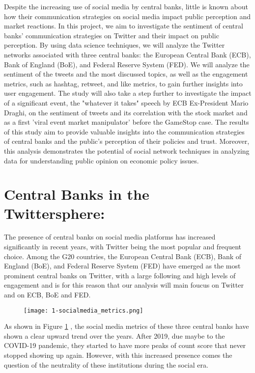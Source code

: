 \documentclass[fleqn,10pt]{SelfArx} %
\begin{document}
Despite the increasing use of social media by central banks, little is known about how their communication strategies on social media impact public perception and market reactions. In this project, we aim to investigate the sentiment of central banks' communication strategies on Twitter and their impact on public perception. By using data science techniques, we will analyze the Twitter networks associated with three central banks: the European Central Bank (ECB), Bank of England (BoE), and Federal Reserve System (FED). We will analyze the sentiment of the tweets and the most discussed topics, as well as the engagement metrics, such as hashtag, retweet, and like metrics, to gain further insights into user engagement. The study will also take a step further to investigate the impact of a significant event,  the "whatever it takes" speech by ECB Ex-President Mario Draghi, on the sentiment of tweets and its correlation with the stock market and as a first 'viral event market manipulator' before the GameStop case. The results of this study aim to provide valuable insights into the communication strategies of central banks and the public's perception of their policies and trust. Moreover, this analysis demonstrates the potential of social network techniques in analyzing  data for understanding public opinion on economic policy issues.




\section{Central Banks in the Twittersphere:}


The presence of central banks on social media platforms has increased significantly in recent years, with Twitter being the most popular and frequent choice. Among the G20 countries, the European Central Bank (ECB), Bank of England (BoE), and Federal Reserve System (FED) have emerged as the most prominent central banks on Twitter, with a large following and high levels of engagement and is for this reason that our analysis will main foucus on Twitter and on ECB, BoE and FED.

\begin{figure}[ht]\centering
	\texttt{[image: 1-socialmedia\_metrics.png]}
	\caption{}
	\label{fig:sm_metrics}
\end{figure}

As shown in Figure \ref{fig:sm_metrics} , the social media metrics of these three central banks have shown a clear upward trend over the years. After 2019, due maybe to the COVID-19 pandemic, they started to have more peaks of count score that never stopped showing up again. However, with this increased presence comes the question of the neutrality of these institutions during the social era.
\end{document}
